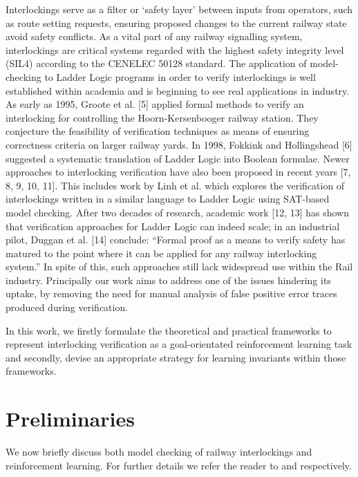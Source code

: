 \documentclass[runningheads]{llncs}
\begin{document}
Interlockings serve as a filter or ‘safety layer’ between inputs from operators, such as route setting requests, ensuring proposed changes to the current railway state avoid safety conflicts. As a vital part of any railway signalling system, interlockings are critical systems regarded with the highest safety integrity level
(SIL4) according to the CENELEC 50128 standard. The application of model-checking
to Ladder Logic programs in order to verify interlockings is well established within
academia and is beginning to see real applications in industry. As early as 1995, Groote
et al. [5] applied formal methods to verify an interlocking for controlling the Hoorn-Kersenbooger railway station. They conjecture the feasibility of verification techniques
as means of ensuring correctness criteria on larger railway yards. In 1998, Fokkink
and Hollingshead [6] suggested a systematic translation of Ladder Logic into Boolean
formulae. Newer approaches to interlocking verification have also been proposed in recent
years [7, 8, 9, 10, 11]. This includes work by Linh et al. which explores the verification
of interlockings written in a similar language to Ladder Logic using SAT-based model
checking. After two decades of research, academic work [12, 13] has shown that verification
approaches for Ladder Logic can indeed scale; in an industrial pilot, Duggan et al. [14]
conclude: “Formal proof as a means to verify safety has matured to the point where it
can be applied for any railway interlocking system.” In spite of this, such approaches
still lack widespread use within the Rail industry. Principally our work aims to address one of the issues hindering its uptake, by removing the need for manual analysis of false positive error traces produced during verification.

In this work, we firstly formulate the theoretical and practical frameworks to represent interlocking verification as a goal-orientated reinforcement learning task and secondly, devise an appropriate strategy for learning invariants within those frameworks.

\section{Preliminaries}\label{sec:preliminaries}
We now briefly discuss both model checking of railway interlockings and reinforcement learning. For further details we refer the reader to \cite{kanso2009automated, james2013verification} and \cite{mnih2016asynchronous} respectively.
\end{document}
